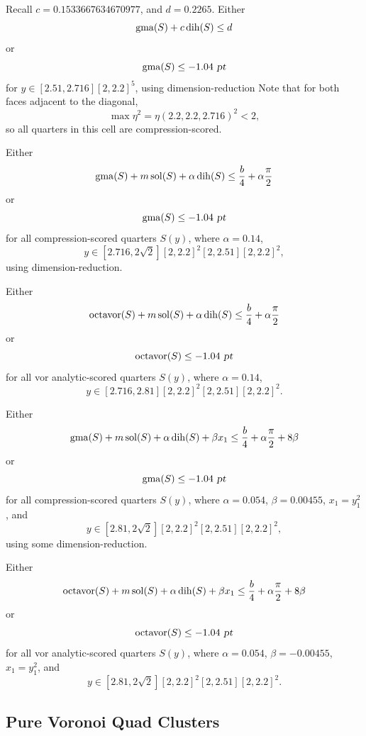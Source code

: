 \begin{calcf}
Recall $c = 0.1533667634670977$, and
$d = 0.2265$.  Either
\[\operatorname{gma}(S) + c \operatorname{dih}(S) \le d\]
or
\[\operatorname{gma}(S) \le -1.04 \text{ \sl pt}\]
for $y \in [2.51,2.716][2,2.2]^5$, using dimension-reduction  Note that for both
faces adjacent to the diagonal,
\[\max \eta^2 = \eta(2.2,2.2,2.716)^2 < 2,\]
so all quarters in this cell are compression-scored.
\label{octa:cut}
\end{calcf}

\begin{calcf}
Either
\[\operatorname{gma}(S) + m \operatorname{sol}(S) + \alpha \operatorname{dih}(S)  \le \frac{b}{4} +
    \alpha \frac{\pi}{2}\]
or
\[\operatorname{gma}(S) \le -1.04 \text{ \sl pt}\]
for all compression-scored
quarters $S(y)$, where $\alpha = 0.14$,
\[y \in [2.716,2\sqrt{2}][2,2.2]^2[2,2.51][2,2.2]^2,\]
using dimension-reduction.
\label{octa:gma:dih}
\end{calcf}

\begin{calcf}
Either
\[\operatorname{octavor}(S) + m \operatorname{sol}(S) + \alpha \operatorname{dih}(S)  \le \frac{b}{4} +
    \alpha \frac{\pi}{2}\]
or
\[\operatorname{octavor}(S) \le -1.04 \text{ \sl pt}\]
for all vor analytic-scored
quarters $S(y)$, where $\alpha = 0.14$,
\[y \in [2.716,2.81][2,2.2]^2[2,2.51][2,2.2]^2.\]
\label{octa:vor:dih}
\end{calcf}

\begin{calcf}
Either
\[\operatorname{gma}(S) + m \operatorname{sol}(S) + \alpha \operatorname{dih}(S) +
    \beta x_1 \le \frac{b}{4} +
    \alpha \frac{\pi}{2} + 8 \beta\]
or
\[\operatorname{gma}(S) \le -1.04 \text{ \sl pt}\]
for all compression-scored
quarters $S(y)$, where $\alpha = 0.054$, $\beta = 0.00455$,
$x_1=y_1^2$, and
\[y \in [2.81,2\sqrt{2}][2,2.2]^2[2,2.51][2,2.2]^2,\]
using some dimension-reduction.
\label{octa:gma:corr}
\end{calcf}

\begin{calcf}
Either
\[\operatorname{octavor}(S) + m \operatorname{sol}(S) + \alpha \operatorname{dih}(S) +
    \beta x_1 \le \frac{b}{4} +
    \alpha \frac{\pi}{2} + 8 \beta\]
or
\[\operatorname{octavor}(S) \le -1.04 \text{ \sl pt}\]
for all vor analytic-scored
quarters $S(y)$, where $\alpha = 0.054$, $\beta = -0.00455$,
$x_1=y_1^2$, and
\[y \in [2.81,2\sqrt{2}][2,2.2]^2[2,2.51][2,2.2]^2.\]
\label{octa:vor:corr}
\end{calcf}


\subsection{Pure Voronoi Quad Clusters}

